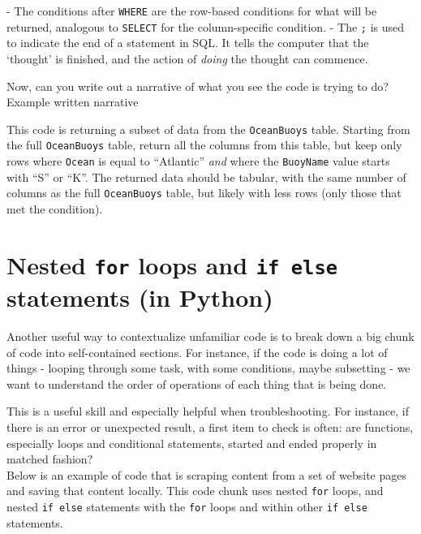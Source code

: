 \documentclass[
]{book}
\begin{document}
\hfill\break
- The conditions after \texttt{WHERE} are the row-based conditions for what will be returned, analogous to \texttt{SELECT} for the column-specific condition.
- The \texttt{;} is used to indicate the end of a statement in SQL. It tells the computer that the `thought' is finished, and the action of \emph{doing} the thought can commence.

Now, can you write out a narrative of what you see the code is trying to do?\\

Example written narrative

This code is returning a subset of data from the \texttt{OceanBuoys} table. Starting from the full \texttt{OceanBuoys} table, return all the columns from this table, but keep only rows where \texttt{Ocean} is equal to ``Atlantic'' \emph{and} where the \texttt{BuoyName} value starts with ``S'' or ``K''. The returned data should be tabular, with the same number of columns as the full \texttt{OceanBuoys} table, but likely with less rows (only those that met the condition).

\hfill\break

\section{\texorpdfstring{Nested \texttt{for} loops and \texttt{if\ else} statements (in Python)}{Nested for loops and if else statements (in Python)}}\label{nested-for-loops-and-if-else-statements-in-python}

Another useful way to contextualize unfamiliar code is to break down a big chunk of code into self-contained sections. For instance, if the code is doing a lot of things - looping through some task, with some conditions, maybe subsetting - we want to understand the order of operations of each thing that is being done.

This is a useful skill and especially helpful when troubleshooting. For instance, if there is an error or unexpected result, a first item to check is often: are functions, especially loops and conditional statements, started and ended properly in matched fashion?\\

Below is an example of code that is scraping content from a set of website pages and saving that content locally. This code chunk uses nested \texttt{for} loops, and nested \texttt{if\ else} statements with the \texttt{for} loops and within other \texttt{if\ else} statements.\\
\end{document}
